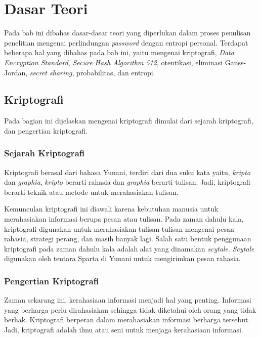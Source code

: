\chapter{Dasar Teori}
\label{chap:dasar teori}

Pada bab ini dibahas dasar-dasar teori yang diperlukan dalam proses penulisan penelitian mengenai perlindungan \textit{password} dengan entropi personal. Terdapat beberapa hal yang dibahas pada bab ini, yaitu mengenai kriptografi, \textit{Data Encryption Standard}, \textit{Secure Hash Algorithm 512}, otentikasi, eliminasi Gauss-Jordan, \textit{secret sharing}, probabilitas, dan entropi.

\section{Kriptografi}

Pada bagian ini dijelaskan mengenai kriptografi dimulai dari sejarah kriptografi, dan pengertian kriptografi.

\subsection{Sejarah Kriptografi}

Kriptografi berasal dari bahasa Yunani, terdiri dari dua suku kata yaitu, \textit{kripto} dan \textit{graphia}, \textit{kripto} berarti rahasia dan \textit{graphia} berarti tulisan. Jadi, kriptografi berarti teknik atau metode untuk merahasiakan tulisan.

Kemunculan kriptografi ini diawali karena kebutuhan manusia untuk merahasiakan informasi berupa pesan atau tulisan. Pada zaman dahulu kala, kriptografi digunakan untuk merahasiakan tulisan-tulisan mengenai pesan rahasia, strategi perang, dan masih banyak lagi. Salah satu bentuk penggunaan kriptografi pada zaman dahulu kala adalah alat yang dinamakan \textit{scytale}. \textit{Scytale} digunakan oleh tentara Sparta di Yunani untuk mengirimkan pesan rahasia\cite{munir2010matematikadiskrit}.

\subsection{Pengertian Kriptografi}

Zaman sekarang ini, kerahasiaan informasi menjadi hal yang penting. Informasi yang berharga perlu dirahasiakan sehingga tidak diketahui oleh orang yang tidak berhak. Kriptografi berperan dalam merahasiakan informasi berharga tersebut. Jadi, kriptografi adalah ilmu atau seni untuk menjaga kerahasiaan informasi.

